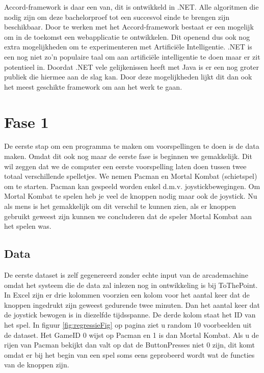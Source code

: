 Accord-framework is daar een van, dit is ontwikkeld in .NET. Alle algoritmen die nodig zijn om deze bachelorproef tot een succesvol einde te brengen zijn beschikbaar. \newline
Door te werken met het Accord-framework bestaat er een mogelijk om in de toekomst een webapplicatie te ontwikkelen. Dit openend dus ook nog extra mogelijkheden om te experimenteren met Artificiële Intelligentie. 
\newline
.NET is een nog niet zo'n populaire taal om aan artificiële intelligentie te doen maar er zit potentieel in. Doordat .NET vele gelijkenissen heeft met Java is er een nog groter publiek die hiermee aan de slag kan.
\newline
Door deze mogelijkheden lijkt dit dan ook het meest geschikte framework om aan het werk te gaan. 

\section{Fase 1}
\label{sec:Fase1}
De eerste stap om een programma te maken om voorspellingen te doen is de data maken. Omdat dit ook nog maar de eerste fase is beginnen we gemakkelijk. Dit wil zeggen dat we de computer een eerste voorspelling laten doen tussen twee totaal verschillende spelletjes. We nemen Pacman en Mortal Kombat (schietspel) om te starten. Pacman kan gespeeld worden enkel d.m.v. joystickbewegingen. Om Mortal Kombat te spelen heb je veel de knoppen nodig maar ook de joystick.  Nu als mens is het gemakkelijk om dit verschil te kunnen zien, als er knoppen gebruikt geweest zijn kunnen we concluderen dat de speler Mortal Kombat aan het spelen was. 

\subsection{Data}
\label{sec:DataFase1}
De eerste dataset is zelf gegenereerd zonder echte input van de arcademachine omdat het systeem die de data zal inlezen nog in ontwikkeling is bij ToThePoint. 
In Excel zijn er drie kolommen voorzien een kolom voor het aantal keer dat de knoppen ingedrukt zijn geweest gedurende twee minuten. Dan het aantal keer dat de joystick bewogen is in diezelfde tijdsspanne. De derde kolom staat het ID van het spel. 
In figuur \ref{fig:regressieFig} op pagina \pageref{fig:regressieFig} ziet u random 10 voorbeelden uit de dataset.
Het GameID 0 wijst op Pacman en 1 is dan Mortal Kombat. Als u de rijen van Pacman bekijkt dan valt op dat de ButtonPresses niet 0 zijn, dit komt omdat er bij het begin van een spel soms eens geprobeerd wordt wat de functies van de knoppen zijn. 

